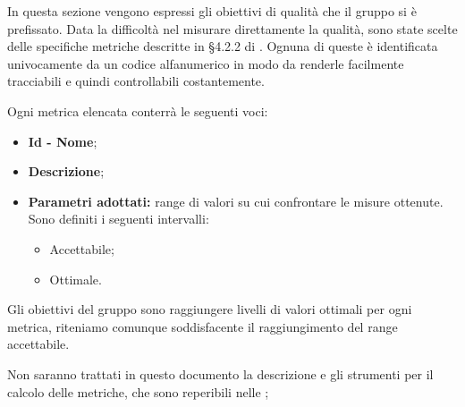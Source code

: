 In questa sezione vengono espressi gli obiettivi di qualità che il gruppo \gruppo \space  si è prefissato. 
Data la difficoltà nel misurare direttamente la qualità, sono state scelte delle specifiche metriche descritte in §4.2.2 di \NdP. 
Ognuna di queste è identificata univocamente da un codice alfanumerico in modo da renderle facilmente tracciabili e quindi controllabili costantemente.

Ogni metrica elencata conterrà le seguenti voci:
\begin{itemize}
	\item \textbf{Id - Nome};
	\item \textbf{Descrizione};
	\item \textbf{Parametri adottati: }range di valori su cui confrontare le misure ottenute. Sono definiti i seguenti intervalli:
	\begin{itemize}
		\item Accettabile;
		\item Ottimale.
	\end{itemize}		
	
\end{itemize}

Gli obiettivi del gruppo sono raggiungere livelli di valori ottimali per ogni metrica, riteniamo comunque soddisfacente
il raggiungimento del range accettabile.

Non saranno trattati in questo documento la descrizione e gli strumenti per il calcolo delle metriche, che sono reperibili nelle \NdP ;
